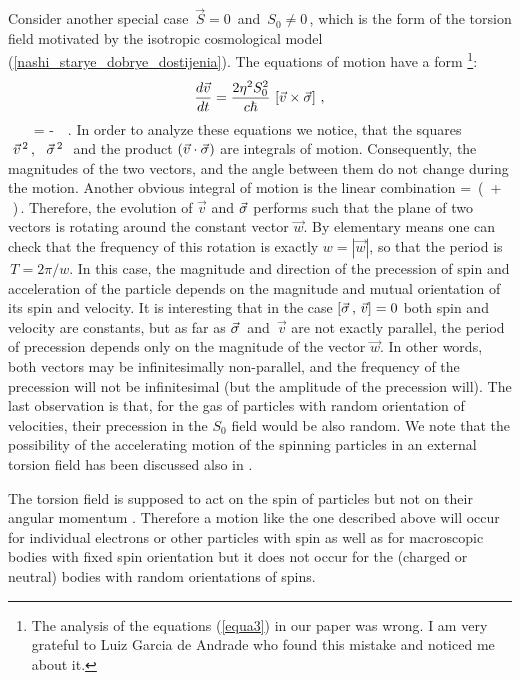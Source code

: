 Consider another special case $\,{\vec {S}} = 0\,$
and $\,S_0\neq 0\,$, which is the form of the torsion field 
motivated by the isotropic cosmological model 
(\ref{nashi_starye_dobrye_dostijenia}). The equations of motion 
have a form \footnote{The analysis of the equations
(\ref{equa3}) in our paper \cite{rysh} was wrong.
I am very grateful to Luiz Garcia de Andrade who found
this mistake and noticed me about it.}:
$$
\frac{d{\vec {v}}}{dt} = \frac{2\eta^2 S_0^2}{c \hbar}\,
\left[{\vec {v}}\times {\vec {\sigma}}\right]\,,
$$
\beq
\,\,\,\,\,\,\,\,\,
 = - \,
\,.
\label{equa3}
\eeq
In order to analyze these equations we notice, that the
squares $\,\,\vec {v}^{\,2}\,,\,\,\,\,{\vec {\sigma}}^{\,2}\,\,$ and 
the product $(\vec {v}\cdot  {\vec {\sigma}})$ are integrals of motion. 
Consequently, the magnitudes of the two vectors, and the angle 
between them do not change during the motion. Another obvious 
integral of motion is the linear combination
\beq
{} = \,\Big(\,{}
+  \,{\vec {\si}}\,\Big)\,.
\label{freq}
\eeq
Therefore, the evolution of ${\vec {v}}$ and ${\vec {\sigma}}$ 
performs such that the plane of two vectors is rotating around the
constant vector ${\vec {w}}$. By elementary means one can check
that the frequency of this rotation is exactly $w=|{\vec {w}}|$,
so that the period is $\,T=2\pi/w$.
In this case, the magnitude and direction of the precession of spin and
acceleration of the particle depends on the magnitude and
mutual orientation of its spin and velocity. It is interesting that
in the case $[\vec {\sigma}\,,\,\vec {v}]=0$ both spin and velocity
are constants, but as far as $\vec {\sigma}\,$ and $\,\vec {v}$
are not exactly parallel, the period of precession depends only on
the magnitude of the vector $\vec {w}$. In other words, both vectors
may be infinitesimally non-parallel, and the frequency of the
precession will not be infinitesimal (but the amplitude of the 
precession will). The last observation is that, for the gas of 
particles with random orientation of velocities, their precession
in the $S_0$ field would be also random. We note that the 
possibility of the accelerating motion of the spinning particles 
in an external torsion field has been discussed also in 
\cite{stoeger,singh}.

The torsion field is supposed to act on the spin of particles
but not on their angular momentum \cite{hehl, stoeger}. Therefore a
motion like the one described above will occur for individual electrons
or other particles with spin as well as for macroscopic bodies with
fixed spin orientation but it does not occur for
the (charged or neutral) bodies with random orientations of spins.


